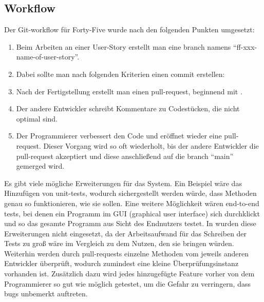 \renewcommand{\kapitelautor}{Autor: Felix Zwickelstorfer}
\subsection{Workflow}\label{subsec:workflow}

Der Git-workflow für Forty-Five wurde nach den folgenden Punkten umgesetzt:
\begin{enumerate}
    \item Beim Arbeiten an einer User-Story erstellt man eine branch namens ``ff-xxx-name-of-user-story''.
    \item Dabei sollte man nach folgenden Kriterien einen commit erstellen:
    \item Nach der Fertigstellung erstellt man einen pull-request, beginnend mit \quoted{[ff-xxx]}.
    \item Der andere Entwickler schreibt Kommentare zu Codestücken, die nicht optimal sind.
    \item Der Programmierer verbessert den Code und eröffnet wieder eine pull-request.
    Dieser Vorgang wird so oft wiederholt, bis der andere Entwickler die pull-request akzeptiert und diese anschließend auf die branch ``main'' gemerged wird.
\end{enumerate}

Es gibt viele mögliche Erweiterungen für das System.
Ein Beispiel wäre das Hinzufügen von unit-tests, wodurch sichergestellt werden würde, dass Methoden genau so funktionieren, wie sie sollen.
Eine weitere Möglichkeit wären end-to-end tests, bei denen ein Programm im GUI (graphical user interface) sich durchklickt und so das gesamte Programm aus Sicht des Endnutzers testet.
In \FF wurden diese Erweiterungen nicht eingesetzt, da der Arbeitsaufwand für das Schreiben der Tests zu groß wäre im Vergleich zu dem Nutzen, den sie bringen würden.
Weiterhin werden durch pull-requests einzelne Methoden vom jeweils anderen Entwickler überprüft, wodurch zumindest eine kleine Überprüfungsinstanz vorhanden ist.
Zusätzlich dazu wird jedes hinzugefügte Feature vorher von dem Programmierer so gut wie möglich getestet, um die Gefahr zu verringern, dass bugs unbemerkt auftreten.
